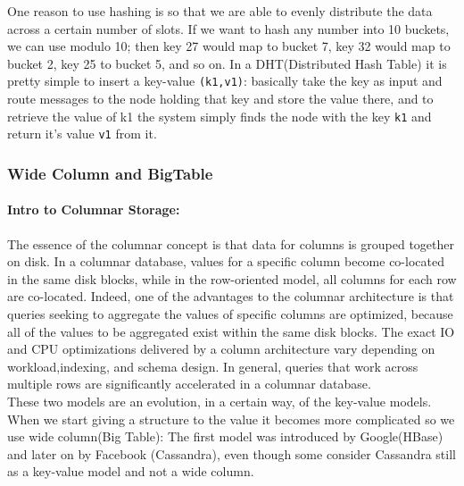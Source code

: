 \documentclass[a4page, 11pt]{article}
\begin{document}
One reason to use hashing is so that we are able to
evenly distribute the data across a certain number of slots. If we want to hash any number into 10 buckets, we can use modulo 10; then key 27 would map to bucket 7, key 32 would map to bucket 2, key 25 to bucket 5, and so on.
\newline
In a DHT(Distributed Hash Table) it is pretty simple to insert a key-value \texttt{(k1,v1)}: basically take the key as input and route messages to the node holding that key and store the value there, and to retrieve the value of k1 the system simply finds the node with the key \texttt{k1} and return it's value \texttt{v1} from it.

\subsubsection{Wide Column and BigTable}
\paragraph{Intro to Columnar Storage:}%
The essence of the columnar concept is that data for columns is grouped together on disk. In a columnar database, values for a specific column become co-located in the same disk blocks, while in the row-oriented model, all columns for each row are co-located. Indeed, one of the advantages to the columnar architecture is that queries seeking to aggregate the values of specific columns are optimized, because all of the values to be aggregated exist within the same disk blocks. The exact IO and CPU optimizations delivered by a column architecture vary depending on workload,indexing, and schema design. In general, queries that work across multiple rows are significantly accelerated in a columnar database.\\

These two models are an evolution, in a certain way, of the key-value models. When we start giving a structure to the value it becomes more complicated so we use wide column(Big Table): The first model was introduced by Google(HBase) and later on by Facebook (Cassandra), even though some consider Cassandra still  as a key-value model and not a wide column.
\end{document}
